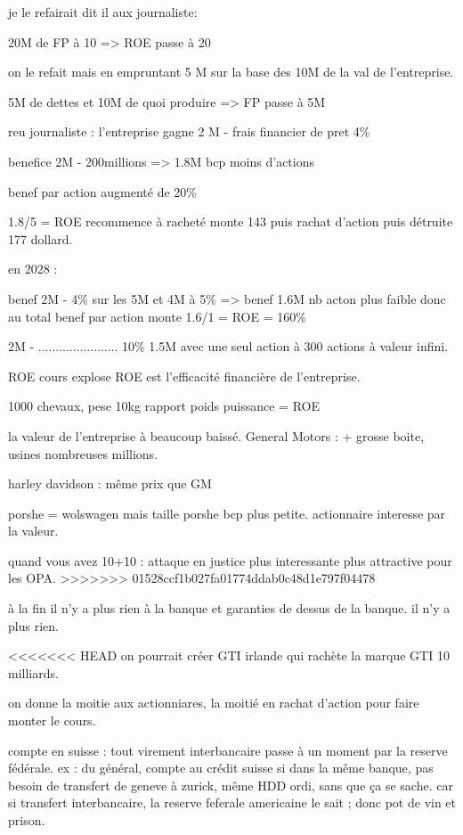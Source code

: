 \documentclass[a4paper,12pt]{article}
\begin{document}
je le refairait dit il aux journaliste:

20M de FP à 10 => ROE passe à 20

on le refait mais en empruntant 5 M sur la base des 10M de la val de l'entreprise.

5M de dettes et 10M de quoi produire => FP passe à 5M

reu journaliste : l'entreprise gagne 2 M - frais financier de pret 4\%


benefice 2M - 200millions => 1.8M  bcp moins d'actions

benef par action augmenté de 20\%

1.8/5 = ROE
recommence à racheté monte 143 puis rachat d'action puis détruite 177 dollard.


en 2028 : 

benef 2M - 4\% sur les 5M et 4M à 5\%  => benef 1.6M nb acton plus faible donc au total
benef par action monte  
1.6/1 = ROE = 160\%
   
2M - ....................... 10\%     1.5M avec une seul action à 300 actions à valeur infini.

ROE   cours explose
ROE est l'efficacité financière de l'entreprise.

1000 chevaux, pese 10kg    rapport poids puissance = ROE

la valeur de l'entreprise à beaucoup baissé.
General Motors : + grosse boite, usines nombreuses millions.

harley davidson : même prix que GM

porshe = wolswagen mais taille porshe bcp plus petite.
actionnaire interesse par la valeur.

quand vous avez 10+10 :
attaque en justice plus interessante
plus attractive pour les OPA.
>>>>>>> 01528ccf1b027fa01774ddab0c48d1e797f04478

à la fin il n'y a plus rien à la banque et garanties de dessus de la banque.
il n'y a plus rien.

<<<<<<< HEAD
on pourrait créer GTI irlande qui rachète la marque GTI 10 milliards.

on donne la moitie aux actionniares, la moitié en rachat d'action pour faire monter le cours.

compte en suisse : tout virement interbancaire passe à un moment par la reserve fédérale.
ex : du général, compte au crédit suisse 
si dans la même banque, pas besoin de transfert de geneve à zurick, même HDD ordi, sans que ça se sache.
car si transfert interbancaire, la reserve feferale americaine le sait ; donc pot de vin et prison.
\end{document}
